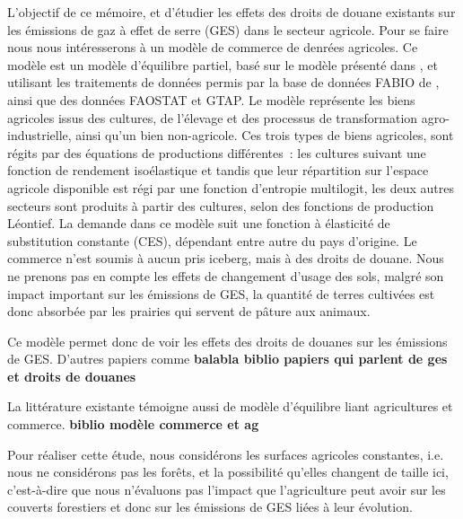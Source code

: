 
L'objectif de ce mémoire, et d'étudier les effets des droits de douane existants sur les émissions de gaz à effet de serre (GES) dans le secteur agricole. Pour se faire nous nous intéresserons à un modèle de commerce de denrées agricoles. Ce modèle est un modèle d'équilibre partiel, basé sur le modèle présenté dans \cite{Gouel2021}, et utilisant les traitements de données permis par la base de données FABIO de \cite{Bruckner2019}, ainsi que des données FAOSTAT et GTAP. Le modèle représente les biens agricoles issus des cultures, de l'élevage et des processus de transformation agro-industrielle, ainsi qu'un bien non-agricole. Ces trois types de biens agricoles, sont régits par des équations de productions différentes~: les cultures suivant une fonction de rendement isoélastique et tandis que leur répartition sur l'espace agricole disponible est régi par une fonction d'entropie multilogit, les deux autres secteurs sont produits à partir des cultures, selon des fonctions de production Léontief. La demande dans ce modèle suit une fonction à élasticité de substitution constante (CES), dépendant entre autre du pays d'origine. Le commerce n'est soumis à aucun pris iceberg, mais à des droits de douane. Nous ne prenons pas en compte les effets de changement d'usage des sols, malgré son impact important sur les émissions de GES, la quantité de terres cultivées est donc absorbée par les prairies qui servent de pâture aux animaux.

Ce modèle permet donc de voir les effets des droits de douanes sur les émissions de GES. D'autres papiers comme \textbf{balabla biblio papiers qui parlent de ges et droits de douanes}

La littérature existante témoigne aussi de modèle d'équilibre liant agricultures et commerce. \textbf{biblio modèle commerce et ag}




Pour réaliser cette étude, nous considérons les surfaces agricoles constantes, i.e. nous ne considérons pas les forêts, et la possibilité qu’elles changent de taille ici, c’est-à-dire que nous n’évaluons pas l’impact que l’agriculture peut avoir sur les couverts forestiers et donc sur les émissions de GES liées à leur évolution.

